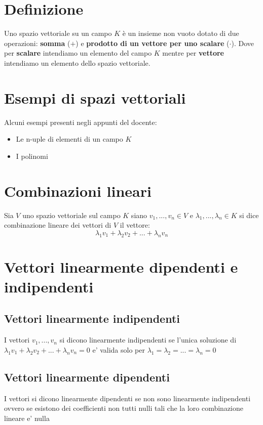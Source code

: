 \documentclass{report}
\begin{document}
\section{Definizione}

Uno spazio vettoriale su un campo $K$ è un insieme non vuoto dotato di
due operazioni: \textbf{somma} ($+$) e \textbf{prodotto di un vettore per uno scalare} ($\cdot$).
Dove per \textbf{scalare} intendiamo un elemento del campo $K$ mentre per \textbf{vettore} intendiamo
un elemento dello spazio vettoriale.

\section{Esempi di spazi vettoriali}
Alcuni esempi presenti negli appunti del docente:
\begin{itemize}
    \item{Le n-uple di elementi di un campo $K$}
    \item{I polinomi}
\end{itemize}

\section{Combinazioni lineari}
Sia $V$ uno spazio vettoriale sul campo $K$ siano $v_1, ..., v_n \in V$ e $\lambda_1, ..., \lambda_n \in K$
si dice combinazione lineare dei vettori di $V$ il vettore:
$$ \lambda_1 v_1 + \lambda_2 v_2 + ... + \lambda_n v_n $$

\section {Vettori linearmente dipendenti e indipendenti}

\subsection {Vettori linearmente indipendenti}
I vettori $v_1, ..., v_n$ si dicono linearmente indipendenti se l'unica soluzione di
$ \lambda_1 v_1 + \lambda_2 v_2 + ... + \lambda_n v_n = 0 $ e' valida solo per
$\lambda_1 = \lambda_2 = ... = \lambda_n = 0$

\subsection {Vettori linearmente dipendenti}
I vettori si dicono linearmente dipendenti se non sono linearmente indipendenti ovvero se esistono
dei coefficienti non tutti nulli tali che la loro combinazione lineare e' nulla
\end{document}

